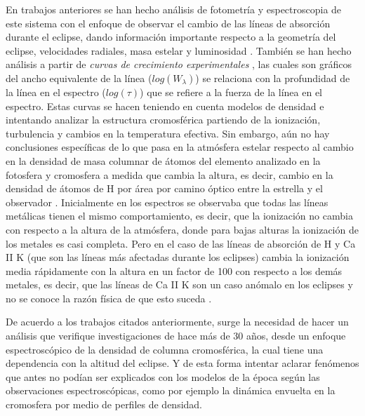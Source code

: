 \documentclass[11pt]{article}
\begin{document}
\noindent En trabajos anteriores se han hecho análisis de fotometría y espectroscopia de este sistema con el enfoque de observar el cambio de las líneas de absorción durante el eclipse, dando información importante respecto a la geometría del eclipse, velocidades radiales, masa estelar y luminosidad \cite{kps9}. También se han hecho análisis a partir de \textit{curvas de crecimiento experimentales} \cite{complete}, las cuales son gráficos del ancho equivalente de la línea ($log(W_{\lambda})$) se relaciona con la profundidad de la línea en el espectro ($log(\tau)$) que se refiere a la fuerza de la línea en el espectro. Estas curvas se hacen teniendo en cuenta modelos de densidad e intentando analizar la estructura cromosférica partiendo de la ionización, turbulencia y cambios en la temperatura efectiva. Sin embargo, aún no hay conclusiones específicas de lo que pasa en la atmósfera estelar respecto al cambio en la densidad de masa columnar de átomos del elemento analizado en la fotosfera y cromosfera a medida que cambia la altura, es decir, cambio en la densidad de átomos de H por área por camino óptico entre la estrella y el observador \cite{rybicki2008radiative}. Inicialmente en los espectros se observaba que todas las líneas metálicas tienen el mismo comportamiento, es decir, que la ionización no cambia con respecto a la altura de la atmósfera, donde para bajas alturas la ionización de los metales es casi completa. Pero en el caso de  las líneas de absorción de H y Ca II K (que son las líneas más afectadas durante los eclipses) cambia la ionización media rápidamente con la altura en un factor de 100 con respecto a los demás metales, es decir, que las líneas de Ca II K son un caso anómalo en los eclipses y no se conoce la razón física de que esto suceda \cite{complete}.

\noindent De acuerdo a los trabajos citados anteriormente, surge la necesidad de hacer un análisis que verifique investigaciones de hace más de 30 años, desde un enfoque espectroscópico de la densidad de columna cromosférica, la cual tiene una dependencia con la altitud del eclipse. Y de esta forma intentar aclarar fenómenos que antes no podían ser explicados con los modelos de la época según las observaciones espectroscópicas, como por ejemplo la dinámica envuelta en la cromosfera por medio de perfiles de densidad. 
\end{document}
